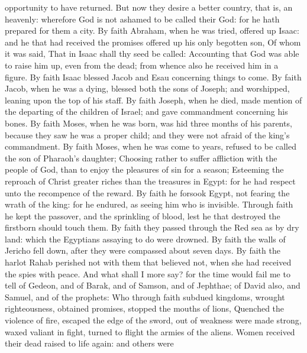 opportunity to have returned.  But now they desire a
better country, that is, an heavenly: wherefore God is not ashamed to be
called their God: for he hath prepared for them a city. 
By faith Abraham, when he was tried, offered up Isaac: and he that had
received the promises offered up his only begotten son, 
Of whom it was said, That in Isaac shall thy seed be called:
 Accounting that God was able to raise him up, even from
the dead; from whence also he received him in a figure. 
By faith Isaac blessed Jacob and Esau concerning things to come.
 By faith Jacob, when he was a dying, blessed both the
sons of Joseph; and worshipped, leaning upon the top of his staff.
 By faith Joseph, when he died, made mention of the
departing of the children of Israel; and gave commandment concerning his
bones.  By faith Moses, when he was born, was hid three
months of his parents, because they saw he was a proper child; and they
were not afraid of the king's commandment.  By faith
Moses, when he was come to years, refused to be called the son of
Pharaoh's daughter;  Choosing rather to suffer affliction
with the people of God, than to enjoy the pleasures of sin for a season;
 Esteeming the reproach of Christ greater riches than the
treasures in Egypt: for he had respect unto the recompence of the
reward.  By faith he forsook Egypt, not fearing the wrath
of the king: for he endured, as seeing him who is invisible.
 Through faith he kept the passover, and the sprinkling
of blood, lest he that destroyed the firstborn should touch them.
 By faith they passed through the Red sea as by dry land:
which the Egyptians assaying to do were drowned.  By
faith the walls of Jericho fell down, after they were compassed about
seven days.  By faith the harlot Rahab perished not with
them that believed not, when she had received the spies with peace.
 And what shall I more say? for the time would fail me to
tell of Gedeon, and of Barak, and of Samson, and of Jephthae; of David
also, and Samuel, and of the prophets:  Who through faith
subdued kingdoms, wrought righteousness, obtained promises, stopped the
mouths of lions,  Quenched the violence of fire, escaped
the edge of the sword, out of weakness were made strong, waxed valiant
in fight, turned to flight the armies of the aliens. 
Women received their dead raised to life again: and others were
